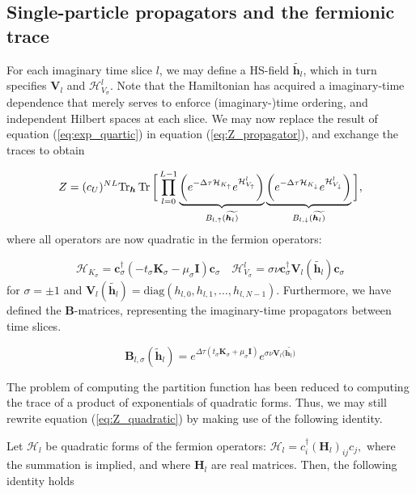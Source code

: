 \subsection{Single-particle propagators and the fermionic trace}\label{subsec:fermiontrace}

For each imaginary time slice $l$, we may define a HS-field $\widetilde{\bm h_l}$, which in turn specifies $\bm V_l$ and $\mathcal{H}_{V_\sigma}^l$.
Note that the Hamiltonian has acquired a  imaginary-time dependence that merely serves to enforce (imaginary-)time ordering, and independent Hilbert spaces at each slice.
We may now replace the result of equation (\ref{eq:exp_quartic}) in equation (\ref{eq:Z_propagator}), and exchange the traces to obtain

\begin{equation}\label{eq:Z_quadratic}
Z  = (c_U)^{NL} \text{Tr}_{\bm h} \operatorname{Tr} \bigg[ \prod_{l=0}^{L-1} \underbrace{\bigg( e^{-\Delta\tau  \mathcal{H}_{K_\uparrow}} e^{\mathcal{H}_{V_\uparrow}^l} \bigg)}_{B_{l, \uparrow}(\widetilde{\bm h_l)}} \underbrace{\bigg( e^{-\Delta\tau  \mathcal{H}_{K_\downarrow}} e^{\mathcal{H}_{V_\downarrow}^l} \bigg)}_{B_{l, \downarrow}(\widetilde{\bm h_l)}} \bigg] ,
\end{equation}
where all operators are now quadratic in the fermion operators:

\begin{equation}
\mathcal{H}_{K_\sigma} = \bm c_\sigma^\dagger ( - t_\sigma \bm K_\sigma -\mu_\sigma \bm I ) \bm c_\sigma \quad \mathcal{H}_{V_\sigma}^l = \sigma \nu \bm c_\sigma^\dagger \bm V_l (\widetilde{\bm h_l}) \bm c_\sigma
\end{equation}
for $\sigma = \pm 1$ and $\bm V_l ( \widetilde{\bm h_l} ) = \text{diag} ( h_{l, 0} , h_{l, 1}, ... , h_{l, N-1} )$.
Furthermore, we have defined the $\bm B$-matrices, representing the imaginary-time propagators between time slices.

\begin{equation}
\bm B_{l, \sigma} ( \widetilde{\bm h}_l ) = e^{\Delta \tau ( t_\sigma \bm K_\sigma + \mu_\sigma \bm I)} e^{\sigma \nu \bm V_l (\widetilde{\bm h_l)}}
\end{equation}

The problem of computing the partition function has been reduced to computing the trace of a product of exponentials of quadratic forms.
Thus, we may still rewrite equation (\ref{eq:Z_quadratic}) by making use of the following identity.

Let $\mathcal{H}_l$ be quadratic forms of the fermion operators: 
$
\mathcal{H}_l = c_i^\dagger (\bm H_l)_{ij} c_j,
$
 where the summation is implied, and where $\bm H_l$ are real matrices.
Then, the following identity holds

